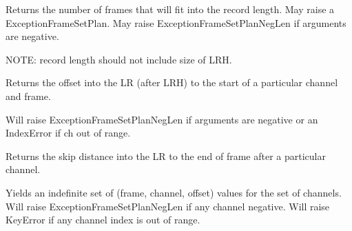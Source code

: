 \documentclass[letterpaper,10pt,english]{sphinxmanual}
\begin{document}
\begin{fulllineitems}

\begin{fulllineitems}
\label{\detokenize{ref/LIS/core/Type01Plan:TotalDepth.LIS.core.Type01Plan.FrameSetPlan.numFrames}}
Returns the number of frames that will fit into the record length.
May raise a ExceptionFrameSetPlan. May raise ExceptionFrameSetPlanNegLen
if arguments are negative.

NOTE: record length should not include size of LRH.

\end{fulllineitems}


\begin{fulllineitems}
\label{\detokenize{ref/LIS/core/Type01Plan:TotalDepth.LIS.core.Type01Plan.FrameSetPlan.chOffset}}
Returns the offset into the LR (after LRH) to the start of a particular channel and frame.

Will raise ExceptionFrameSetPlanNegLen if arguments are negative or an IndexError if ch out of range.

\end{fulllineitems}


\begin{fulllineitems}
\label{\detokenize{ref/LIS/core/Type01Plan:TotalDepth.LIS.core.Type01Plan.FrameSetPlan.skipToEndOfFrame}}
Returns the skip distance into the LR to the end of frame after a
particular channel.

\end{fulllineitems}


\begin{fulllineitems}
\label{\detokenize{ref/LIS/core/Type01Plan:TotalDepth.LIS.core.Type01Plan.FrameSetPlan.genOffsets}}
Yields an indefinite set of (frame, channel, offset) values for the
set of channels.
Will raise ExceptionFrameSetPlanNegLen if any channel negative.
Will raise KeyError if any channel index is out of range.


\end{fulllineitems}
\end{fulllineitems}
\end{document}
